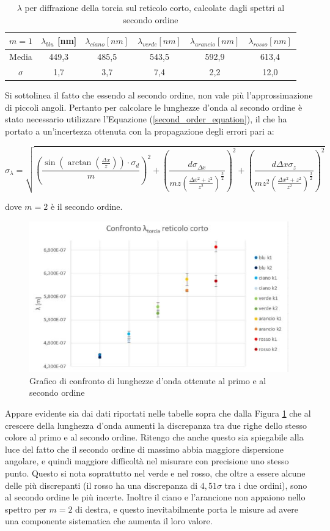 \documentclass{article}
\begin{document}
\begin{table}[h]
    \centering
\begin{tabular}{||c|c|c|c|c|c||}
    \hline
     $m = 1$ & \cellcolor{blue}$\lambda_{blu}$ [nm] & \cellcolor{cyan}$\lambda_{ciano} [nm]$ & \cellcolor{green}$\lambda_{verde}[nm]$ & \cellcolor{orange}$\lambda_{arancio}[nm]$ & \cellcolor{red}$\lambda_{rosso}[nm]$ \\
    \hline
    Media & 449,3 & 485,5 & 543,5 & 592,9 & 613,4 \\
    $\sigma$ & 1,7 & 3,7 & 7,4 & 2,2 & 12,0\\
    \hline
\end{tabular}
\caption{$\lambda$ per diffrazione della torcia sul reticolo corto, calcolate dagli spettri al secondo ordine}
\end{table}
\pagebreak
Si sottolinea il fatto che essendo al secondo ordine, non vale più l'approssimazione di piccoli angoli. Pertanto per calcolare le lunghezze d'onda al secondo ordine è stato necessario utilizzare l'Equazione (\ref{second_order_equation}), il che ha portato a un'incertezza ottenuta con la propagazione degli errori pari a:

\begin{equation}
    \sigma_\lambda = \sqrt{\left(\frac{\sin(\arctan(\frac{\Delta x}{z}))\cdot \sigma_d}{m}\right)^2 + \left(\frac{d\sigma_{\Delta x}}{mz\left(\frac{\Delta x^2 + z^2}{z^2}\right)^\frac{3}{2}}\right)^2 + \left(\frac{d\Delta x \sigma_z}{mz^2\left(\frac{\Delta x^2+z^2}{z^2}\right)^\frac{3}{2}}\right)^2}
\end{equation}

dove $m=2$ è il secondo ordine.
\pagebreak
\begin{figure}
    \centering 
    \includegraphics[width=0.6\linewidth]{TorciaCorto_graph.JPG}
    \caption{Grafico di confronto di lunghezze d'onda ottenute al primo e al secondo ordine}
    \label{confrontoCorto}
\end{figure}

Appare evidente sia dai dati riportati nelle tabelle sopra che dalla Figura \ref{confrontoCorto} che al crescere della lunghezza d'onda aumenti la discrepanza tra due righe dello stesso colore al primo e al secondo ordine. Ritengo che anche questo sia spiegabile alla luce del fatto che il secondo ordine di massimo abbia maggiore dispersione angolare, e quindi maggiore difficoltà nel misurare con precisione uno stesso punto. Questo si nota soprattutto nel verde e nel rosso, che oltre a essere alcune delle più discrepanti (il rosso ha una discrepanza di $4,51\sigma$ tra i due ordini), sono al secondo ordine le più incerte. Inoltre il ciano e l'arancione non appaiono nello spettro per $m=2$ di destra, e questo inevitabilmente porta le misure ad avere una componente sistematica che aumenta il loro valore.
\end{document}
